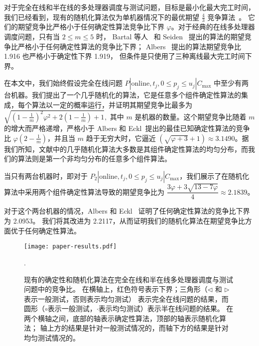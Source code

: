 对于完全在线和半在线的多处理器调度与测试问题，目标是最小化最大完工时间，我们已经看到，现有的随机化算法仅为单机器情况下的最优期望 \(\frac43\) 竞争算法~\cite{durr2018scheduling,durr2020adversarial,albers2021explorable}。
它们的期望竞争比严格小于任何确定性算法竞争比下界 \( \varphi \)。对于经典的在线多处理器调度问题，只有当 \( 2 \leq m \leq 5 \) 时，
Bartal 等人~\cite{bartal1992new} 和 Seiden~\cite{seiden2000online} 提出的算法的期望竞争比严格小于任何确定性算法的竞争比下界；
Albers~\cite{albers2002randomized} 提出的算法期望竞争比 1.916 也严格小于确定性下界 1.919，
但条件是只使用了三种离线最大完工时间下界。

在本文中，我们始终假设完全在线问题 \( P | \text{online}, t_j, 0 \leq p_j \leq u_j | C_{\text{max}} \) 中至少有两台机器。我们提出了一个几乎随机化的算法，它是任意多个组件确定性算法的集成，每个算法以一定的概率运行，并证明其期望竞争比最多为
\(
\sqrt{\left(1 - \frac{1}{m}\right)^2 \varphi^2 + 2\left(1 - \frac{1}{m}\right) + 1},
\)
其中 \( m \) 是机器的数量。这个期望竞争比随着 \( m \) 的增大而严格递增，严格小于 Albers 和 Eckl~\cite{albers2021scheduling}提出的最佳已知确定性算法的竞争比 \( \varphi(2 - \frac{1}{m}) \)，并且当 \( m \) 趋于无穷大时，它逼近 \( (\sqrt{\varphi + 3} + 1) \approx 3.1490 \)。据我们所知，文献中的几乎随机化算法大多数是其组件确定性算法的均匀分布，而我们的算法则是第一个非均匀分布的任意多个组件算法。

当只有两台机器时，即对于 \( P_2 | \text{online}, t_j, 0 \leq p_j \leq u_j | C_{\text{max}} \)，我们展示了在随机化算法中采用两个组件确定性算法导致的期望竞争比为
\(\dfrac{3\varphi + 3\sqrt{13 - 7\varphi}}{4} \approx 2.1839。\)

对于这个两台机器的情况，Albers 和 Eckl~\cite{albers2021scheduling} 证明了任何确定性算法的竞争比下界为 2.0953。
我们将其改进为 2.2117，从而证明我们的随机化算法在期望竞争比方面优于任何确定性算法。

\begin{figure}[t]
    \centering
    \texttt{[image: paper-results.pdf]}
    \caption{现有的确定性和随机化算法在完全在线和半在线多处理器调度与测试问题中的竞争比。
    在横轴上，红色符号表示下界；三角形（\( \triangleleft \) 和 \( \triangleright \) 表示一般测试，否则表示均匀测试）
    表示完全在线问题的结果，而圆形（\(\circ\)表示一般测试，\(\cdot\)表示均匀测试）表示半在线问题的结果。
    在两个横轴之间，底部的轴表示确定性算法，顶部的轴表示随机化算法；
    轴上方的结果是针对一般测试情况的，而轴下方的结果是针对均匀测试情况的。
    }.
    \label{fig:paper-results}
\end{figure}

